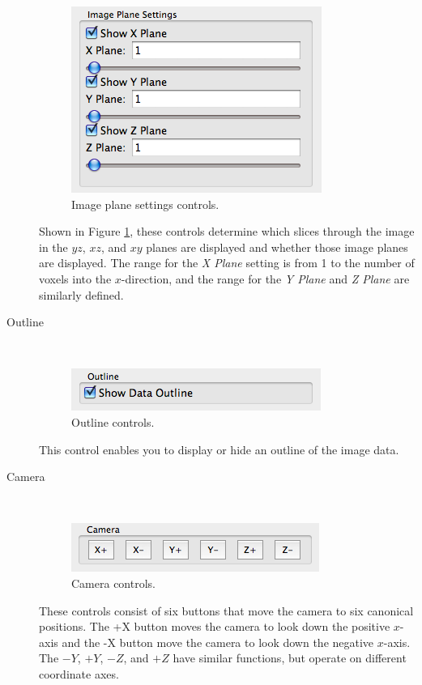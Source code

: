 \documentclass[11pt,titlepage,twoside]{article}
\begin{document}
\begin{description}
    \begin{figure}[h]
    \centering
    \includegraphics[scale=0.5]{images/ImagePlaneSettingsControls}
    \caption{Image plane settings controls.}
    \label{fig:ImagePlaneSettingsControls}
  \end{figure}
  
  Shown in Figure \ref{fig:ImagePlaneSettingsControls}, these controls determine which slices through the image in the $yz$, $xz$, and $xy$ planes are displayed and whether those image planes are displayed. The range for the \emph{X Plane} setting is from 1 to the number of voxels into the $x$-direction, and the range for the \emph{Y Plane} and \emph{Z Plane} are similarly defined.

  \item[Outline] \hfill \\
  
  \begin{figure}[h]
    \centering
    \includegraphics[scale=0.5]{images/OutlineControls}
    \caption{Outline controls.}
    \label{fig:OutlineControls}
  \end{figure}
  
  
  This control enables you to display or hide an outline of the image data.

  \item[Camera] \hfill \\
  
  \begin{figure}[h]
    \centering
    \includegraphics[scale=0.5]{images/CameraControls}
    \caption{Camera controls.}
    \label{fig:CameraControls}
  \end{figure}
  
  These controls consist of six buttons that move the camera to six canonical positions. The +X button moves the camera to look down the positive $x$-axis and the -X button move the camera to look down the negative $x$-axis. The $-Y$, $+Y$, $-Z$, and $+Z$ have similar functions, but operate on different coordinate axes.

\end{description}
\end{document}

